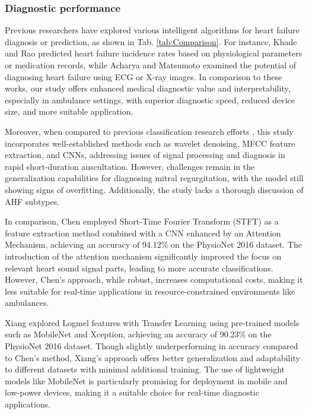 \subsubsection{Diagnostic performance}
Previous researchers have explored various intelligent algorithms for heart failure diagnosis or prediction, as shown in Tab. \ref{tab:Comparison}. For instance, Khade \cite{khade2019system} and Rao \cite{rao2022explainable} predicted heart failure incidence rates based on physiological parameters or medication records, while Acharya \cite{acharya2019deep} and Matsumoto \cite{matsumoto2020diagnosing} examined the potential of diagnosing heart failure using ECG or X-ray images. In comparison to these works, our study offers enhanced medical diagnostic value and interpretability, especially in ambulance settings, with superior diagnostic speed, reduced device size, and more suitable application.

Moreover, when compared to previous classification research efforts \cite{vepa2009classification, wu2010hidden, rubin2016classifying, arora2021transfer, li2021lightweight, shuvo2021cardioxnet}, this study incorporates well-established methods such as wavelet denoising, MFCC feature extraction, and CNNs, addressing issues of signal processing and diagnosis in rapid short-duration auscultation. However, challenges remain in the generalization capabilities for diagnosing mitral regurgitation, with the model still showing signs of overfitting. Additionally, the study lacks a thorough discussion of AHF subtypes.

In comparison, Chen \cite{chen2023robust} employed Short-Time Fourier Transform (STFT) as a feature extraction method combined with a CNN enhanced by an Attention Mechanism, achieving an accuracy of 94.12\% on the PhysioNet 2016 dataset. The introduction of the attention mechanism significantly improved the focus on relevant heart sound signal parts, leading to more accurate classifications. However, Chen's approach, while robust, increases computational costs, making it less suitable for real-time applications in resource-constrained environments like ambulances.

Xiang \cite{xiang2023research} explored Logmel features with Transfer Learning using pre-trained models such as MobileNet and Xception, achieving an accuracy of 90.23\% on the PhysioNet 2016 dataset. Though slightly underperforming in accuracy compared to Chen’s method, Xiang's approach offers better generalization and adaptability to different datasets with minimal additional training. The use of lightweight models like MobileNet is particularly promising for deployment in mobile and low-power devices, making it a suitable choice for real-time diagnostic applications.

